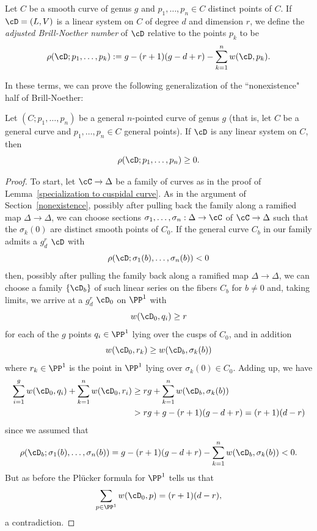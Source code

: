 \begin{definition}
Let $C$ be a smooth curve of genus $g$ and $p_1,\dots,p_n \in C$ distinct points of $C$. If $\cD = (L,V)$ is a linear system on $C$ of degree $d$ and dimension $r$, we define the \emph{adjusted Brill-Noether number} of $\cD$ relative to the points $p_k$ to be
$$
\rho(\cD; p_1,\dots,p_k) := g - (r+1)(g-d+r) - \sum_{k=1}^n w(\cD,p_k).
$$
\end{definition}

In these terms, we can prove the following generalization of the ``nonexistence" half of Brill-Noether:

\begin{theorem}\label{Brill-Noether with inflection}
Let $(C;p_1,\dots,p_n)$ be a general $n$-pointed curve of genus $g$ (that is, let $C$ be a general curve and $p_1,\dots,p_n \in C$ general points). If $\cD$ is any linear system on $C$, then
$$
\rho(\cD; p_1,\dots,p_n) \geq 0.
$$
\end{theorem}

\begin{proof}
To start, let $\cC \to \Delta$ be a family of curves as in the proof of Lemma~\ref{specialization to cuspidal curve}.
As in the argument of Section~\ref{nonexistence}, possibly
after pulling back the family along a ramified map $\Delta \to \Delta$, we can choose sections $\sigma_1, \dots, \sigma_n : \Delta \to \cC$  of $\cC \to \Delta$ such that the $\sigma_k(0)$ are distinct smooth points of $C_0$.
If the general curve $C_b$ in our family admits a $g^r_d$ $\cD$ with
$$
\rho(\cD;\sigma_1(b),\dots,\sigma_n(b)) < 0
$$
then, possibly after pulling the family back along a ramified map $\Delta \to \Delta$, we can choose a family $\{\cD_b\}$ of such linear series 
on the fibers $C_b$ for $b \neq 0$ and, taking limits, we arrive at a $g^r_d$ $\cD_0$ on $\PP^1$ with
$$
w(\cD_0, q_i) \geq r
$$
for each of the $g$ points $q_i \in \PP^1$ lying over the cusps of $C_0$, and in addition
$$
w(\cD_0, r_k) \geq w(\cD_b,\sigma_k(b))
$$
where $r_k \in \PP^1$ is the point in $\PP^1$ lying over $\sigma_k(0) \in C_0$. Adding up, we have
\begin{align*}
\sum_{i=1}^g w(\cD_0, q_i) + \sum_{k=1}^n w(\cD_0, r_i) &\geq rg + \sum_{k=1}^n w(\cD_b,\sigma_k(b)) \\
&> rg + g - (r+1)(g-d+r) = (r+1)(d-r)
\end{align*}
since we assumed that 
$$
\rho(\cD_b;\sigma_1(b),\dots,\sigma_n(b)) = g - (r+1)(g-d+r) - \sum_{k=1}^n w(\cD_b,\sigma_k(b)) < 0.
$$
But as before the Pl\"ucker formula for $\PP^1$ tells us that
$$
\sum_{p \in \PP^1} w(\cD_0, p) = (r+1)(d-r),
$$
a contradiction.
\end{proof}


